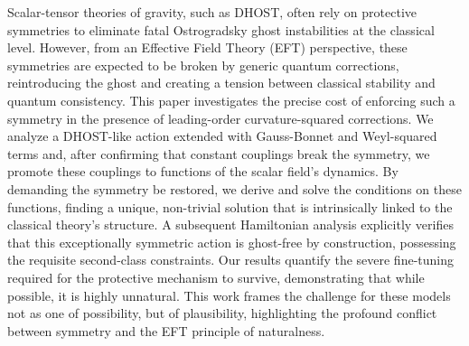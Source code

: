 \documentclass[twocolumn]{aastex631}
\begin{document}
Scalar-tensor theories of gravity, such as DHOST, often rely on protective symmetries to eliminate fatal Ostrogradsky ghost instabilities at the classical level. However, from an Effective Field Theory (EFT) perspective, these symmetries are expected to be broken by generic quantum corrections, reintroducing the ghost and creating a tension between classical stability and quantum consistency. This paper investigates the precise cost of enforcing such a symmetry in the presence of leading-order curvature-squared corrections. We analyze a DHOST-like action extended with Gauss-Bonnet and Weyl-squared terms and, after confirming that constant couplings break the symmetry, we promote these couplings to functions of the scalar field's dynamics. By demanding the symmetry be restored, we derive and solve the conditions on these functions, finding a unique, non-trivial solution that is intrinsically linked to the classical theory's structure. A subsequent Hamiltonian analysis explicitly verifies that this exceptionally symmetric action is ghost-free by construction, possessing the requisite second-class constraints. Our results quantify the severe fine-tuning required for the protective mechanism to survive, demonstrating that while possible, it is highly unnatural. This work frames the challenge for these models not as one of possibility, but of plausibility, highlighting the profound conflict between symmetry and the EFT principle of naturalness.
\end{document}
